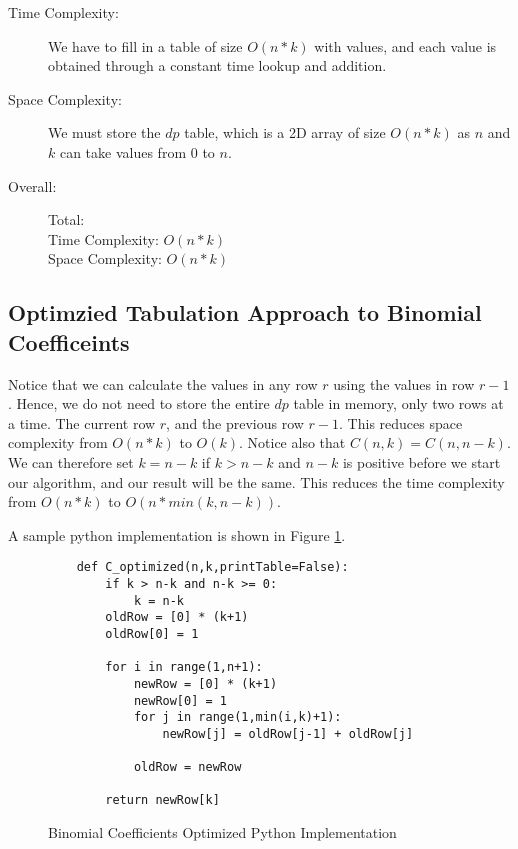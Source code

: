 \begin{description}
    \item[Time Complexity:]
        We have to fill in a table of size $O(n * k)$ with values, and each value is obtained through a constant time lookup and addition.

    \item[Space Complexity:] 
        We must store the $dp$ table, which is a 2D array of size $O(n * k)$ as $n$ and $k$ can take values from $0$ to $n$.
        
    \item[Overall:] Total:\\
        Time Complexity: $O(n * k)$\\
        Space Complexity: $O(n * k)$
    
\end{description}

\subsection{Optimzied Tabulation Approach to Binomial Coefficeints}
Notice that we can calculate the values in any row $r$ using the values in row $r-1$.
Hence, we do not need to store the entire $dp$ table in memory, only two rows at a time.
The current row $r$, and the previous row $r-1$.
This reduces space complexity from $O(n * k)$ to $O(k)$.
Notice also that $C(n,k) = C(n,n-k)$.
We can therefore set $k = n-k$ if $k > n-k$ and $n-k$ is positive before we start our algorithm, and our result will be the same.
This reduces the time complexity from $O(n * k)$ to $O(n * min(k,n-k))$.

A sample python implementation is shown in Figure \ref{fig:binomial-optimized}.

\begin{figure}[H]
    \centering
    \begin{lstlisting}
    def C_optimized(n,k,printTable=False):
        if k > n-k and n-k >= 0:
            k = n-k
        oldRow = [0] * (k+1)
        oldRow[0] = 1
    
        for i in range(1,n+1):
            newRow = [0] * (k+1)
            newRow[0] = 1
            for j in range(1,min(i,k)+1):
                newRow[j] = oldRow[j-1] + oldRow[j]
    
            oldRow = newRow
              
        return newRow[k]
    \end{lstlisting}
    \caption{Binomial Coefficients Optimized Python Implementation}
    \label{fig:binomial-optimized}
\end{figure}

